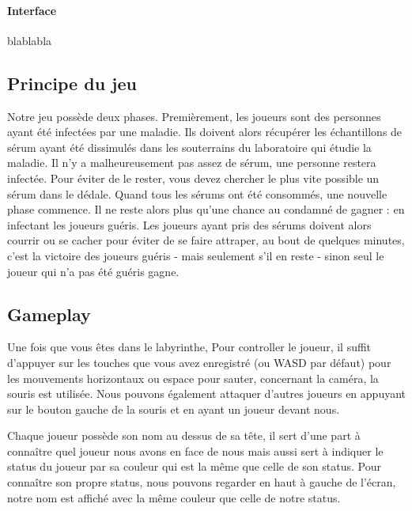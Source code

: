 \documentclass{article}
\begin{document}
\paragraph{Interface}
blablabla



\newpage
\subsection{Principe du jeu}

Notre jeu possède deux phases.
Premièrement, les joueurs sont des personnes ayant été infectées par une maladie. Ils doivent alors récupérer les échantillons de sérum ayant été dissimulés dans les souterrains du laboratoire qui étudie la maladie. Il n'y a malheureusement pas assez de sérum, une personne restera infectée. Pour éviter de le rester, vous devez chercher le plus vite possible un sérum dans le dédale.
Quand tous les sérums ont été consommés, une nouvelle phase commence. Il ne reste alors plus qu'une chance au condamné de gagner : en infectant les joueurs guéris. Les joueurs ayant pris des sérums doivent alors courrir ou se cacher pour éviter de se faire attraper, au bout de quelques minutes, c'est la victoire des joueurs guéris - mais seulement s'il en reste - sinon seul le joueur qui n'a pas été guéris gagne.


\subsection{Gameplay}

Une fois que vous êtes dans le labyrinthe,
Pour controller le joueur, il suffit d'appuyer sur les touches que vous avez enregistré (ou WASD par défaut) pour les mouvements horizontaux ou espace pour sauter, concernant la caméra, la souris est utilisée. Nous pouvons également attaquer d'autres joueurs en appuyant sur le bouton gauche de la souris et en ayant un joueur devant nous.


Chaque joueur possède son nom au dessus de sa tête, il sert d'une part à connaître quel joueur nous avons en face de nous mais aussi sert à indiquer le status du joueur par sa couleur qui est la même que celle de son status.
Pour connaître son propre status, nous pouvons regarder en haut à gauche de l'écran, notre nom est affiché avec la même couleur que celle de notre status.
\end{document}

